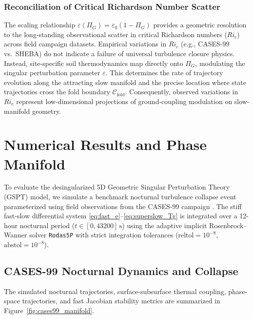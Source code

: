 \documentclass[11pt]{article}
\begin{document}
\subsubsection{Reconciliation of Critical Richardson Number Scatter}
The scaling relationship $\varepsilon(\Pi_G) = \varepsilon_0 (1 - \Pi_G)$ provides a geometric resolution to the long-standing observational scatter in critical Richardson numbers ($Ri_c$) across field campaign datasets. Empirical variations in $Ri_c$ (e.g., CASES-99 vs.\ SHEBA) do not indicate a failure of universal turbulence closure physics. Instead, site-specific soil thermodynamics map directly onto $\Pi_G$, modulating the singular perturbation parameter $\varepsilon$. This determines the rate of trajectory evolution along the attracting slow manifold and the precise location where state trajectories cross the fold boundary $\mathcal{C}_{\text{fold}}$. Consequently, observed variations in $Ri_c$ represent low-dimensional projections of ground-coupling modulation on slow-manifold geometry.

\section{Numerical Results and Phase Manifold}
\label{sec:numerical_results}

To evaluate the desingularized 5D Geometric Singular Perturbation Theory (GSPT) model, we simulate a benchmark nocturnal turbulence collapse event parameterized using field observations from the CASES-99 campaign \citep{poulos2002cases99}. The stiff fast-slow differential system \eqref{eq:fast_e}--\eqref{eq:superslow_Tg} is integrated over a 12-hour nocturnal period ($t \in [0, 43200]\,\mathrm{s}$) using the adaptive implicit Rosenbrock--Wanner solver \texttt{Rodas5P} \citep{Steinebach2023Rodas5P} with strict integration tolerances ($\text{reltol} = 10^{-8}$, $\text{abstol} = 10^{-8}$).

\subsection{CASES-99 Nocturnal Dynamics and Collapse}
\label{subsec:cases99_results}

The simulated nocturnal trajectories, surface-subsurface thermal coupling, phase-space trajectories, and fast Jacobian stability metrics are summarized in Figure~\ref{fig:cases99_manifold}.
\end{document}
